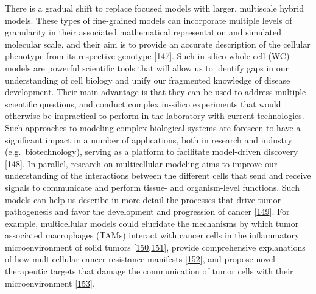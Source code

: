 \documentclass[
  12pt,
]{book}
\begin{document}
There is a gradual shift to replace focused models with larger, multiscale hybrid models.
These types of fine-grained models can incorporate multiple levels of granularity in their associated mathematical representation and simulated molecular scale, and their aim is to provide an accurate description of the cellular phenotype from its respective genotype {[}\protect\hyperlink{ref-Karr2012}{147}{]}.
Such in-silico whole-cell (WC) models are powerful scientific tools that will allow us to identify gaps in our understanding of cell biology and unify our fragmented knowledge of disease development.
Their main advantage is that they can be used to address multiple scientific questions, and conduct complex in-silico experiments that would otherwise be impractical to perform in the laboratory with current technologies.
Such approaches to modeling complex biological systems are foreseen to have a significant impact in a number of applications, both in research and industry (e.g.~biotechnology), serving as a platform to facilitate model-driven discovery {[}\protect\hyperlink{ref-Carrera2015}{148}{]}.
In parallel, research on multicellular modeling aims to improve our understanding of the interactions between the different cells that send and receive signals to communicate and perform tissue- and organism-level functions.
Such models can help us describe in more detail the processes that drive tumor pathogenesis and favor the development and progression of cancer {[}\protect\hyperlink{ref-Senft2017}{149}{]}.
For example, multicellular models could elucidate the mechanisms by which tumor associated macrophages (TAMs) interact with cancer cells in the inflammatory microenvironment of solid tumors {[}\protect\hyperlink{ref-Fukuda2012}{150},\protect\hyperlink{ref-Marku2020}{151}{]}, provide comprehensive explanations of how multicellular cancer resistance manifests {[}\protect\hyperlink{ref-Desoize2000}{152}{]}, and propose novel therapeutic targets that damage the communication of tumor cells with their microenvironment {[}\protect\hyperlink{ref-Komohara2016}{153}{]}.
\end{document}
